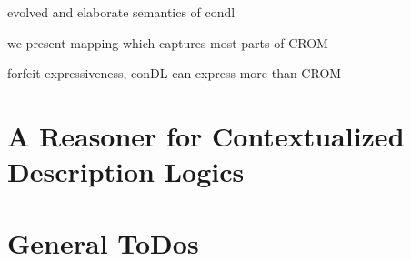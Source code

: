 evolved and elaborate semantics of condl

we present mapping which captures most parts of CROM

forfeit expressiveness, conDL can express more than CROM


\blindtext 


\section{A Reasoner for Contextualized Description Logics}
\label{sec:intro-reasoner}


\blindtext




\clearpage

\section{General ToDos}
\label{sec:todos}





